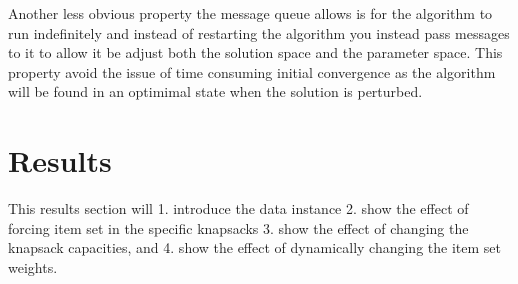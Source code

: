 \documentclass[preprint,12pt,authoryear]{elsarticle}
\begin{document}
Another less obvious property the message queue allows is for the algorithm to run indefinitely and instead of restarting the algorithm you instead pass messages to it to allow it be adjust both the solution space and the parameter space.
This property avoid the issue of time consuming initial convergence as the algorithm will be found in an optimimal state when the solution is perturbed.  

\section{Results}
\label{sec:3-results}
This results section will 1. introduce the data instance 2. show the effect of forcing item set in the specific knapsacks 3. show the effect of changing the 
knapsack capacities, and 4. show the effect of dynamically changing the item set weights. 
\end{document}
